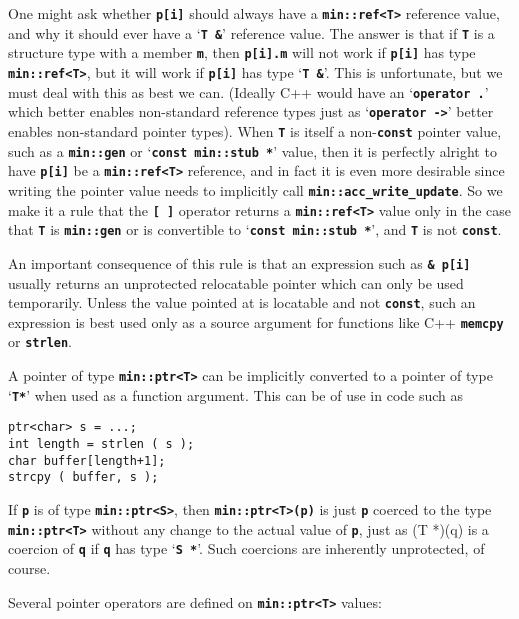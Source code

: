 \documentclass[12pt]{article}
\newcommand{\TT}[1]{{\tt \bfseries #1}}
\newcommand{\EOL}{\penalty \exhyphenpenalty}
\newenvironment{indpar}[1][0.3in]%
	{\begin{list}{}%
		     {\setlength{\itemsep}{0in}%
		      \setlength{\topsep}{0in}%
		      \setlength{\parsep}{1ex}%
		      \setlength{\labelwidth}{#1}%
		      \setlength{\leftmargin}{#1}%
		      \addtolength{\leftmargin}{\labelsep}}%
	 \item}%
	{\end{list}}
\begin{document}
One might ask whether \TT{p[i]} should always have a \TT{min::\EOL ref<T>}
reference value, and why it should ever have a `\TT{T \&}' reference
value.  The answer is that if \TT{T} is a structure type with a member
\TT{m}, then \TT{p[i].m} will not work if \TT{p[i]} has type
\TT{min::\EOL ref<T>}, but it will work if \TT{p[i]} has type
`\TT{T \&}'.  This is unfortunate, but we must deal with this as best
we can.  (Ideally C++ would have an `\TT{operator .}' which better
enables non-standard reference types just as
`\TT{operator ->}' better enables non-standard pointer types).
When \TT{T} is itself a non-\TT{const}
pointer value, such as a \TT{min::gen} or
`\TT{const min::\EOL stub~*}' value, then it is perfectly alright
to have \TT{p[i]} be a \TT{min::\EOL ref<T>} reference, and in
fact it is even more desirable since writing the pointer value
needs to implicitly call \TT{min::\EOL acc\_\EOL write\_\EOL update}.
So we make it a rule that the \TT{[\,]} operator returns a
\TT{min::ref<T>} value only in the case that \TT{T} is
\TT{min::\EOL gen} or is convertible to `\TT{const min::\EOL stub~*}',
and \TT{T} is not \TT{const}.

An important consequence of this rule is that an expression such as
\TT{\& p[i]} usually returns an unprotected relocatable pointer which can only
be used temporarily.  Unless the value pointed at is locatable
and not \TT{const}, such an expression is best used only as a source
argument for functions like C++ \TT{memcpy} or \TT{strlen}.

A pointer of type \TT{min::ptr<T>} can be implicitly converted to a
pointer of type `\TT{T*}' when used as a function argument.
This can be of use in code such as
\begin{indpar}\begin{verbatim}
ptr<char> s = ...;
int length = strlen ( s );
char buffer[length+1];
strcpy ( buffer, s );
\end{verbatim}\end{indpar}

If \TT{p} is of type \TT{min::ptr<S>}, then \TT{min::ptr<T>(p)} is just
\TT{p} coerced to the type \TT{min::\EOL ptr<T>} without any change to the
actual value of \TT{p}, just as {(T *)(q)} is a coercion of \TT{q}
if \TT{q} has type `\TT{S *}'.  Such coercions are inherently
unprotected, of course.

Several pointer operators are defined on \TT{min::ptr<T>} values:
\end{document}
